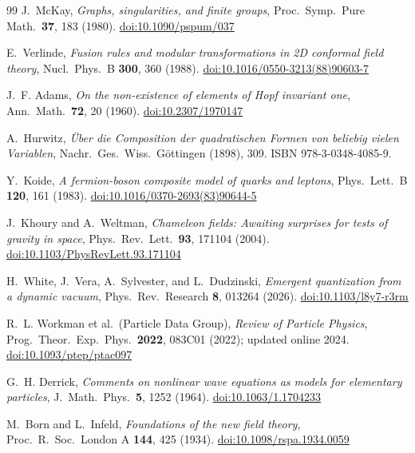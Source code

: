 \documentclass[11pt,a4paper]{article}
\theoremstyle{definition}
\theoremstyle{remark}
\begin{document}
\begin{thebibliography}{99}
J.~McKay,
\textit{Graphs, singularities, and finite groups},
Proc.\ Symp.\ Pure Math.\ \textbf{37}, 183 (1980).
\href{https://doi.org/10.1090/pspum/037}{doi:10.1090/pspum/037}

E.~Verlinde,
\textit{Fusion rules and modular transformations in 2D conformal field theory},
Nucl.\ Phys.\ B \textbf{300}, 360 (1988).
\href{https://doi.org/10.1016/0550-3213(88)90603-7}{doi:10.1016/0550-3213(88)90603-7}

J.~F. Adams,
\textit{On the non-existence of elements of Hopf invariant one},
Ann.\ Math.\ \textbf{72}, 20 (1960).
\href{https://doi.org/10.2307/1970147}{doi:10.2307/1970147}

A.~Hurwitz,
\textit{\"Uber die Composition der quadratischen Formen von beliebig vielen
Variablen},
Nachr.\ Ges.\ Wiss.\ G\"ottingen (1898), 309.
ISBN 978-3-0348-4085-9.

Y.~Koide,
\textit{A fermion-boson composite model of quarks and leptons},
Phys.\ Lett.\ B \textbf{120}, 161 (1983).
\href{https://doi.org/10.1016/0370-2693(83)90644-5}{doi:10.1016/0370-2693(83)90644-5}

J.~Khoury and A.~Weltman,
\textit{Chameleon fields: Awaiting surprises for tests of gravity in space},
Phys.\ Rev.\ Lett.\ \textbf{93}, 171104 (2004).
\href{https://doi.org/10.1103/PhysRevLett.93.171104}{doi:10.1103/PhysRevLett.93.171104}

H.~White, J.~Vera, A.~Sylvester, and L.~Dudzinski,
\textit{Emergent quantization from a dynamic vacuum},
Phys.\ Rev.\ Research \textbf{8}, 013264 (2026).
\href{https://doi.org/10.1103/l8y7-r3rm}{doi:10.1103/l8y7-r3rm}

R.~L. Workman et al.\ (Particle Data Group),
\textit{Review of Particle Physics},
Prog.\ Theor.\ Exp.\ Phys.\ \textbf{2022}, 083C01 (2022);
updated online 2024.
\href{https://doi.org/10.1093/ptep/ptac097}{doi:10.1093/ptep/ptac097}

G.~H. Derrick,
\textit{Comments on nonlinear wave equations as models for elementary particles},
J.\ Math.\ Phys.\ \textbf{5}, 1252 (1964).
\href{https://doi.org/10.1063/1.1704233}{doi:10.1063/1.1704233}

M.~Born and L.~Infeld,
\textit{Foundations of the new field theory},
Proc.\ R.\ Soc.\ London A \textbf{144}, 425 (1934).
\href{https://doi.org/10.1098/rspa.1934.0059}{doi:10.1098/rspa.1934.0059}


\end{thebibliography}
\end{document}
